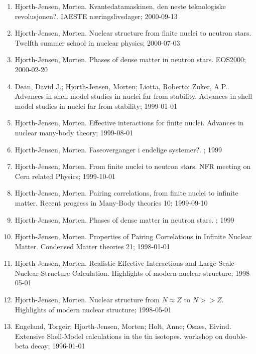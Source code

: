 \documentclass[%
oneside,                 %
final,                   %
10pt]{article}
\begin{document}
\begin{enumerate}
\item Hjorth-Jensen, Morten. Kvantedatamaskinen, den neste teknologiske revolusjonen?. IAESTE næringslivsdager; 2000-09-13

\item Hjorth-Jensen, Morten. Nuclear structure from finite nuclei to neutron stars. Twelfth summer school in nuclear physics; 2000-07-03

\item Hjorth-Jensen, Morten. Phases of dense matter in neutron stars. EOS2000; 2000-02-20

\item Dean, David J.; Hjorth-Jensen, Morten; Liotta, Roberto; Zuker, A.P.. Advances in shell model studies in nuclei far from stability. Advances in shell model studies in nuclei far from stability; 1999-01-01

\item Hjorth-Jensen, Morten. Effective interactions for finite nuclei. Advances in nuclear many-body theory; 1999-08-01

\item Hjorth-Jensen, Morten.  Faseoverganger i endelige systemer?. ; 1999

\item Hjorth-Jensen, Morten. From finite nuclei to neutron stars. NFR meeting on Cern related Physics; 1999-10-01

\item Hjorth-Jensen, Morten. Pairing correlations, from finite nuclei to infinite matter. Recent progress in Many-Body theories 10; 1999-09-10

\item Hjorth-Jensen, Morten.  Phases of dense matter in neutron stars. ; 1999

\item Hjorth-Jensen, Morten. Properties of Pairing Correlations in Infinite Nuclear Matter. Condensed Matter theories 21; 1998-01-01

\item Hjorth-Jensen, Morten.  Realistic Effective Interactions and Large-Scale Nuclear Structure Calculation. Highlights of modern nuclear structure; 1998-05-01

\item Hjorth-Jensen, Morten. Nuclear structure from $N\approx Z$ to $N >>Z$. Highlights of modern nuclear structure; 1998-05-01

\item Engeland, Torgeir; Hjorth-Jensen, Morten; Holt, Anne; Osnes, Eivind. Extensive Shell-Model calculations in the tin isotopes. workshop on double-beta decay; 1996-01-01


\end{enumerate}
\end{document}
